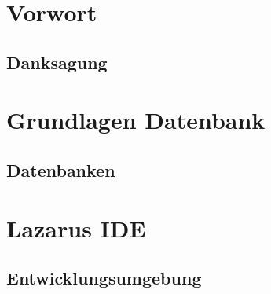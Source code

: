 \documentclass[
titlepage,						%
]
{scrreprt}
\begin{document}
\tableofcontents			%

\newpage
\chapter[Vorwort]{Vorwort}
\section{Danksagung}

\chapter{Grundlagen Datenbank}
\section[Datenbanken]{Datenbanken}

\newpage

\newpage

\chapter{Lazarus IDE}
\section[Entwicklungsumgebung]{Entwicklungsumgebung}

\newpage

\newpage

\newpage
\end{document}
